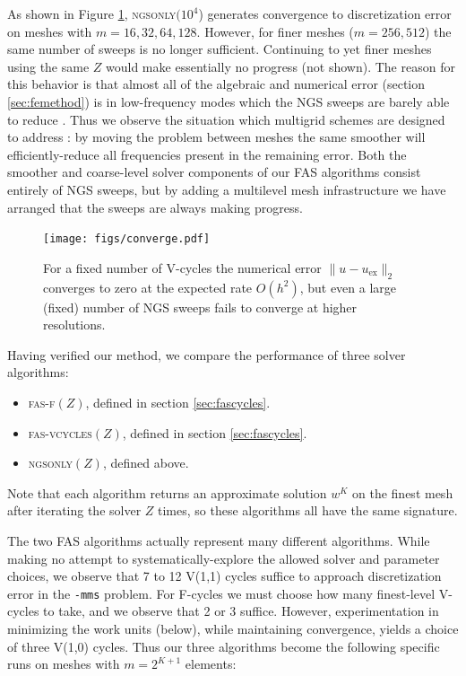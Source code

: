 \documentclass[letterpaper,final,12pt,reqno]{amsart}
\begin{document}
As shown in Figure \ref{fig:converge}, \textsc{ngsonly}$(10^4$) generates convergence to discretization error on meshes with $m=16,32,64,128$.  However, for finer meshes ($m=256,512$) the same number of sweeps is no longer sufficient.  Continuing to yet finer meshes using the same $Z$ would make essentially no progress (not shown).  The reason for this behavior is that almost all of the algebraic and numerical error (section \ref{sec:femethod}) is in low-frequency modes which the NGS sweeps are barely able to reduce \cite[Chapter 6]{Bueler2021}.  Thus we observe the situation which multigrid schemes are designed to address \cite{BrandtLivne2011,Briggsetal2000}: by moving the problem between meshes the same smoother will efficiently-reduce all frequencies present in the remaining error.  Both the smoother and coarse-level solver components of our FAS algorithms consist entirely of NGS sweeps, but by adding a multilevel mesh infrastructure we have arranged that the sweeps are always making progress.

\begin{figure}
\texttt{[image: figs/converge.pdf]}
\caption{For a fixed number of V-cycles the numerical error $\|u-u_{\text{ex}}\|_2$ converges to zero at the expected rate $O(h^2)$, but even a large (fixed) number of NGS sweeps fails to converge at higher resolutions.}
\label{fig:converge}
\end{figure}

Having verified our method, we compare the performance of three solver algorithms:

\begin{itemize}
\item \textsc{fas-f}$(Z)$, defined in section \ref{sec:fascycles}.
\item \textsc{fas-vcycles}$(Z)$, defined in section \ref{sec:fascycles}.
\item \textsc{ngsonly}$(Z)$, defined above.
\end{itemize}

\noindent Note that each algorithm returns an approximate solution $w^K$ on the finest mesh after iterating the solver $Z$ times, so these algorithms all have the same signature.

The two FAS algorithms actually represent many different algorithms.  While making no attempt to systematically-explore the allowed solver and parameter choices, we observe that 7 to 12 V(1,1) cycles suffice to approach discretization error in the \texttt{-mms} problem.  For F-cycles we must choose how many finest-level V-cycles to take, and we observe that 2 or 3 suffice.  However, experimentation in minimizing the work units (below), while maintaining convergence, yields a choice of three V(1,0) cycles.  Thus our three algorithms become the following specific runs on meshes with $m=2^{K+1}$ elements:
\end{document}
